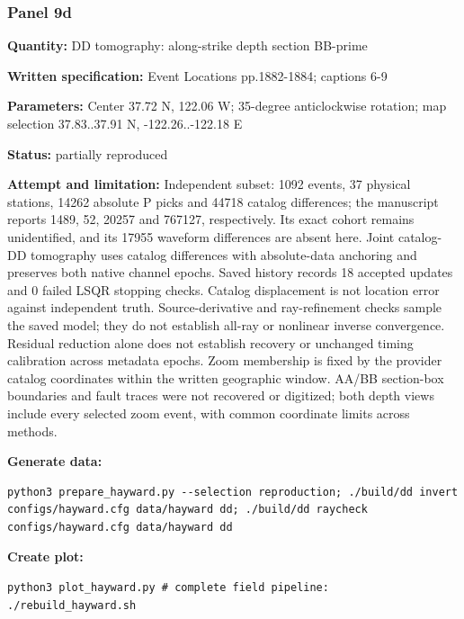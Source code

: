 \subsubsection*{Panel 9d}
\noindent\textbf{Quantity:} DD tomography: along-strike depth section BB-prime\par
\noindent\textbf{Written specification:} Event Locations pp.1882-1884; captions 6-9\par
\noindent\textbf{Parameters:} Center 37.72 N, 122.06 W; 35-degree anticlockwise rotation; map selection 37.83..37.91 N, -122.26..-122.18 E\par
\noindent\textbf{Status:} partially reproduced\par
\noindent\textbf{Attempt and limitation:} Independent subset: 1092 events, 37 physical stations, 14262 absolute P picks and 44718 catalog differences; the manuscript reports 1489, 52, 20257 and 767127, respectively. Its exact cohort remains unidentified, and its 17955 waveform differences are absent here. Joint catalog-DD tomography uses catalog differences with absolute-data anchoring and preserves both native channel epochs. Saved history records 18 accepted updates and 0 failed LSQR stopping checks. Catalog displacement is not location error against independent truth. Source-derivative and ray-refinement checks sample the saved model; they do not establish all-ray or nonlinear inverse convergence. Residual reduction alone does not establish recovery or unchanged timing calibration across metadata epochs. Zoom membership is fixed by the provider catalog coordinates within the written geographic window. AA/BB section-box boundaries and fault traces were not recovered or digitized; both depth views include every selected zoom event, with common coordinate limits across methods.\par
\noindent\textbf{Generate data:}
\begin{lstlisting}
python3 prepare_hayward.py --selection reproduction; ./build/dd invert configs/hayward.cfg data/hayward dd; ./build/dd raycheck configs/hayward.cfg data/hayward dd
\end{lstlisting}
\noindent\textbf{Create plot:}
\begin{lstlisting}
python3 plot_hayward.py # complete field pipeline: ./rebuild_hayward.sh
\end{lstlisting}
